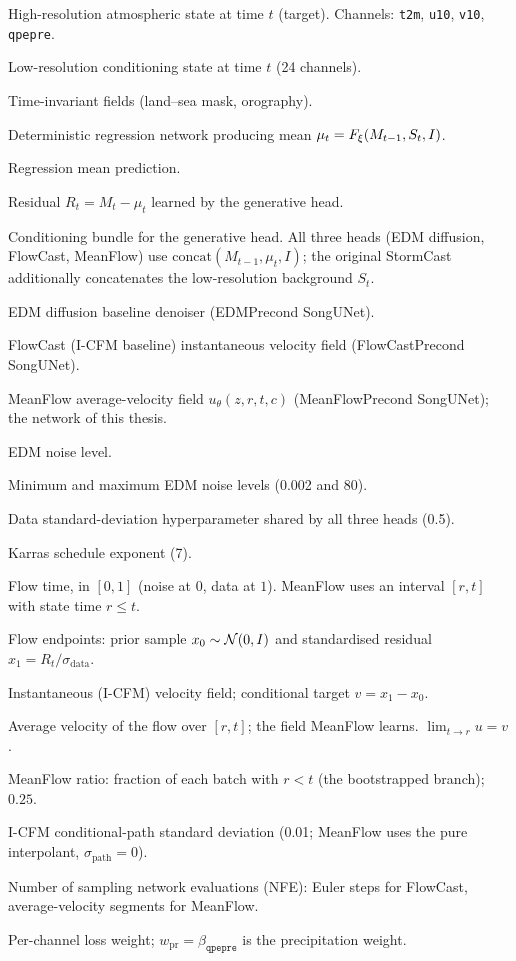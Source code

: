 \begin{denotation}[3cm]
\item[$M_t$]{High-resolution atmospheric state at time $t$ (target). Channels: \texttt{t2m}, \texttt{u10}, \texttt{v10}, \texttt{qpepre}.}
\item[$S_t$]{Low-resolution conditioning state at time $t$ (24 channels).}
\item[$I$]{Time-invariant fields (land--sea mask, orography).}
\item[$\Freg$]{Deterministic regression network producing mean $\mu_t = F_{\xi}(M_{t-1}, S_t, I)$.}
\item[$\mu_t$]{Regression mean prediction.}
\item[$R_t$]{Residual $R_t = M_t - \mu_t$ learned by the generative head.}
\item[$c$]{Conditioning bundle for the generative head. All three heads (EDM diffusion, FlowCast, MeanFlow) use $\mathrm{concat}(M_{t-1}, \mu_t, I)$; the original StormCast additionally concatenates the low-resolution background $S_t$.}
\item[$\Dedm$]{EDM diffusion baseline denoiser (EDMPrecond SongUNet).}
\item[$\vnet$]{FlowCast (I-CFM baseline) instantaneous velocity field (FlowCastPrecond SongUNet).}
\item[$\unet$]{MeanFlow average-velocity field $u_\theta(z, r, t, c)$ (MeanFlowPrecond SongUNet); the network of this thesis.}
\item[$\sigma$]{EDM noise level.}
\item[$\sigma_{\min},\sigma_{\max}$]{Minimum and maximum EDM noise levels (0.002 and 80).}
\item[$\sigma_{\text{data}}$]{Data standard-deviation hyperparameter shared by all three heads (0.5).}
\item[$\rho$]{Karras schedule exponent (7).}
\item[$t$ (or $r,t$)]{Flow time, in $[0, 1]$ (noise at $0$, data at $1$). MeanFlow uses an interval $[r, t]$ with state time $r \le t$.}
\item[$x_0, x_1$]{Flow endpoints: prior sample $x_0 \sim \mathcal{N}(0,I)$ and standardised residual $x_1 = R_t/\sigma_{\text{data}}$.}
\item[$v$]{Instantaneous (I-CFM) velocity field; conditional target $v = x_1 - x_0$.}
\item[$u(z_r, r, t)$]{Average velocity of the flow over $[r, t]$; the field MeanFlow learns. $\lim_{t\to r} u = v$.}
\item[$\rho_{\text{MF}}$]{MeanFlow ratio: fraction of each batch with $r < t$ (the bootstrapped branch); $0.25$.}
\item[$\sigma_{\text{path}}$]{I-CFM conditional-path standard deviation (0.01; MeanFlow uses the pure interpolant, $\sigma_{\text{path}}=0$).}
\item[$K$]{Number of sampling network evaluations (NFE): Euler steps for FlowCast, average-velocity segments for MeanFlow.}
\item[$\beta_k$]{Per-channel loss weight; $w_{\text{pr}} = \beta_{\texttt{qpepre}}$ is the precipitation weight.}

\end{denotation}
